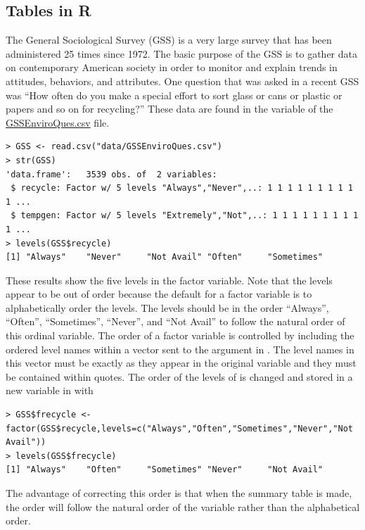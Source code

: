 \documentclass[10pt,openany]{book}\usepackage[]{graphicx}\usepackage[]{color}
\makeatletter
\newenvironment{kframe}{%
 \def\at@end@of@kframe{}%
 \ifinner\ifhmode%
  \def\at@end@of@kframe{\end{minipage}}%
  \begin{minipage}{\columnwidth}%
 \fi\fi%
 \def\FrameCommand##1{\hskip\@totalleftmargin \hskip-\fboxsep
 \colorbox{shadecolor}{##1}\hskip-\fboxsep
     \hskip-\linewidth \hskip-\@totalleftmargin \hskip\columnwidth}%
 \MakeFramed {\advance\hsize-\width
   \@totalleftmargin\z@ \linewidth\hsize
   \@setminipage}}%
 {\par\unskip\endMakeFramed%
 \at@end@of@kframe}
\newenvironment{knitrout}{}{} %
\makeatother
\begin{document}
\subsection{Tables in R}
The General Sociological Survey (GSS) is a very large survey that has been administered 25 times since 1972.  The basic purpose of the GSS is to gather data on contemporary American society in order to monitor and explain trends in attitudes, behaviors, and attributes.  One question that was asked in a recent GSS was ``How often do you make a special effort to sort glass or cans or plastic or papers and so on for recycling?''  These data are found in the  variable of the \href{https://raw.githubusercontent.com/droglenc/NCData/master/GSSEnviroQues.csv}{GSSEnviroQues.csv} file.
\begin{knitrout}
\color{fgcolor}\begin{kframe}
\begin{verbatim}
> GSS <- read.csv("data/GSSEnviroQues.csv")
> str(GSS)
'data.frame':	3539 obs. of  2 variables:
 $ recycle: Factor w/ 5 levels "Always","Never",..: 1 1 1 1 1 1 1 1 1 1 ...
 $ tempgen: Factor w/ 5 levels "Extremely","Not",..: 1 1 1 1 1 1 1 1 1 1 ...
> levels(GSS$recycle)
[1] "Always"    "Never"     "Not Avail" "Often"     "Sometimes"
\end{verbatim}
\end{kframe}
\end{knitrout}

These results show the five levels in the  factor variable.  Note that the levels appear to be out of order because the default for a factor variable is to alphabetically order the levels.  The levels should be in the order ``Always'', ``Often'', ``Sometimes'', ``Never'', and ``Not Avail'' to follow the natural order of this ordinal variable.  The order of a factor variable is controlled by including the ordered level names within a vector sent to the  argument in .  The level names in this vector must be exactly as they appear in the original variable and they must be contained within quotes.  The order of the levels of  is changed and stored in a new variable in  with
\begin{knitrout}
\color{fgcolor}\begin{kframe}
\begin{verbatim}
> GSS$frecycle <- factor(GSS$recycle,levels=c("Always","Often","Sometimes","Never","Not Avail"))
> levels(GSS$frecycle)
[1] "Always"    "Often"     "Sometimes" "Never"     "Not Avail"
\end{verbatim}
\end{kframe}
\end{knitrout}
The advantage of correcting this order is that when the summary table is made, the order will follow the natural order of the variable rather than the alphabetical order.
\end{document}
